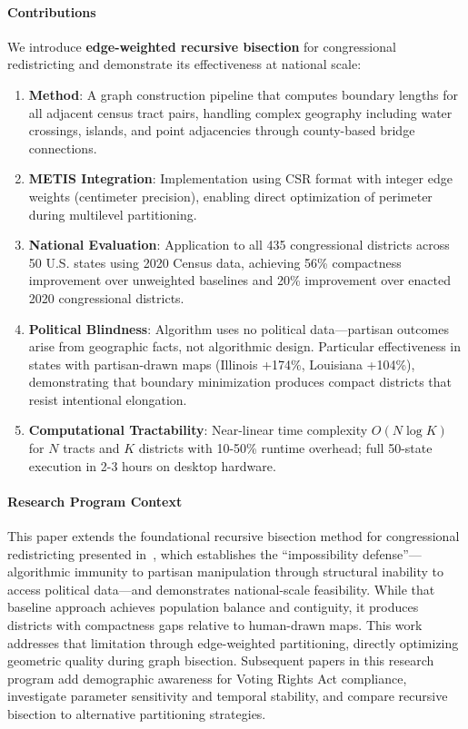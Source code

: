 \paragraph{Contributions} We introduce \textbf{edge-weighted recursive bisection} for congressional redistricting and demonstrate its effectiveness at national scale:

\begin{enumerate}
    \item \textbf{Method}: A graph construction pipeline that computes boundary lengths for all adjacent census tract pairs, handling complex geography including water crossings, islands, and point adjacencies through county-based bridge connections.

    \item \textbf{METIS Integration}: Implementation using CSR format with integer edge weights (centimeter precision), enabling direct optimization of perimeter during multilevel partitioning.

    \item \textbf{National Evaluation}: Application to all 435 congressional districts across 50 U.S. states using 2020 Census data, achieving 56\% compactness improvement over unweighted baselines and 20\% improvement over enacted 2020 congressional districts.

    \item \textbf{Political Blindness}: Algorithm uses no political data—partisan outcomes arise from geographic facts, not algorithmic design. Particular effectiveness in states with partisan-drawn maps (Illinois +174\%, Louisiana +104\%), demonstrating that boundary minimization produces compact districts that resist intentional elongation.

    \item \textbf{Computational Tractability}: Near-linear time complexity $O(N \log K)$ for $N$ tracts and $K$ districts with 10-50\% runtime overhead; full 50-state execution in 2-3 hours on desktop hardware.
\end{enumerate}

\paragraph{Research Program Context} This paper extends the foundational recursive bisection method for congressional redistricting presented in~\cite{della-libera-recursive-bisection}, which establishes the ``impossibility defense''—algorithmic immunity to partisan manipulation through structural inability to access political data—and demonstrates national-scale feasibility. While that baseline approach achieves population balance and contiguity, it produces districts with compactness gaps relative to human-drawn maps. This work addresses that limitation through edge-weighted partitioning, directly optimizing geometric quality during graph bisection. Subsequent papers in this research program add demographic awareness for Voting Rights Act compliance, investigate parameter sensitivity and temporal stability, and compare recursive bisection to alternative partitioning strategies.

